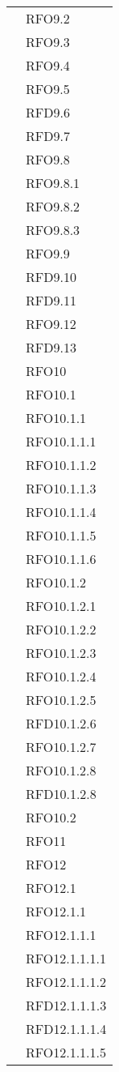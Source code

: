 \begin{longtable}{ p{12cm} | p{4cm} }
			& RFO9.2 \\
			& RFO9.3 \\
			& RFO9.4 \\
			& RFO9.5 \\
			& RFD9.6 \\
			& RFD9.7 \\
			& RFO9.8 \\
			& RFO9.8.1 \\
			& RFO9.8.2 \\
			& RFO9.8.3 \\
			& RFO9.9 \\
			& RFD9.10 \\
			& RFD9.11 \\
			& RFO9.12 \\
			& RFD9.13 \\
			& RFO10 \\
			& RFO10.1 \\
			& RFO10.1.1 \\
			& RFO10.1.1.1 \\
			& RFO10.1.1.2 \\
			& RFO10.1.1.3 \\
			& RFO10.1.1.4 \\
			& RFO10.1.1.5 \\
			& RFO10.1.1.6 \\
			& RFO10.1.2 \\
			& RFO10.1.2.1 \\
			& RFO10.1.2.2 \\
			& RFO10.1.2.3 \\
			& RFO10.1.2.4 \\
			& RFO10.1.2.5 \\
			& RFD10.1.2.6 \\
			& RFO10.1.2.7 \\
			& RFO10.1.2.8 \\
			& RFD10.1.2.8 \\
			& RFO10.2 \\
			& RFO11 \\
			& RFO12 \\
			& RFO12.1 \\
			& RFO12.1.1 \\
			& RFO12.1.1.1 \\
			& RFO12.1.1.1.1 \\
			& RFO12.1.1.1.2 \\
			& RFD12.1.1.1.3 \\
			& RFD12.1.1.1.4 \\
			& RFO12.1.1.1.5 \\

\end{longtable}
